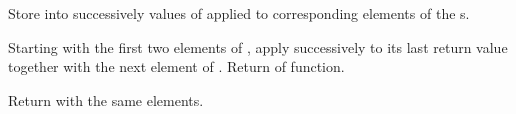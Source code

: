 \begin{LIST}{1cm}
  {
  Store into  successively values of
   applied to corresponding elements of the s. 
  }

  {
  Starting with the first two elements of , apply
   successively to its last return value together with the next
  element of . Return  of {function}.
  }

  {
  Return  with the same elements.
  }


\end{LIST}


